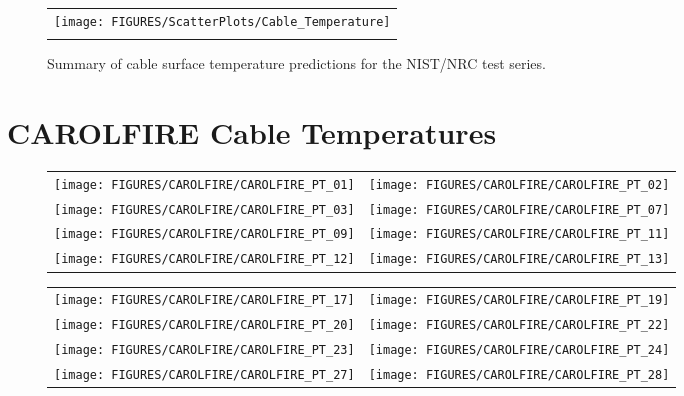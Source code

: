 \begin{figure}[p]
\begin{center}
\begin{tabular}{c}
\texttt{[image: FIGURES/ScatterPlots/Cable\_Temperature]} \\
\vspace{0.25in}
\end{tabular}
\end{center}
\caption[Summary of cable surface temperature predictions, NIST/NRC test series.]
{Summary of cable surface temperature predictions for the NIST/NRC test series.}
\end{figure}



\clearpage

\section{CAROLFIRE Cable Temperatures}

\begin{figure}[p]
\begin{tabular*}{\textwidth}{l@{\extracolsep{\fill}}r}
\texttt{[image: FIGURES/CAROLFIRE/CAROLFIRE\_PT\_01]} &
\texttt{[image: FIGURES/CAROLFIRE/CAROLFIRE\_PT\_02]} \\
\texttt{[image: FIGURES/CAROLFIRE/CAROLFIRE\_PT\_03]} &
\texttt{[image: FIGURES/CAROLFIRE/CAROLFIRE\_PT\_07]} \\
\texttt{[image: FIGURES/CAROLFIRE/CAROLFIRE\_PT\_09]} &
\texttt{[image: FIGURES/CAROLFIRE/CAROLFIRE\_PT\_11]} \\
\texttt{[image: FIGURES/CAROLFIRE/CAROLFIRE\_PT\_12]} &
\texttt{[image: FIGURES/CAROLFIRE/CAROLFIRE\_PT\_13]} 
\end{tabular*}
\label{CAROLFIRE_Thermoset_1}
\end{figure}

\begin{figure}[p]
\begin{tabular*}{\textwidth}{l@{\extracolsep{\fill}}r}
\texttt{[image: FIGURES/CAROLFIRE/CAROLFIRE\_PT\_17]} &
\texttt{[image: FIGURES/CAROLFIRE/CAROLFIRE\_PT\_19]} \\
\texttt{[image: FIGURES/CAROLFIRE/CAROLFIRE\_PT\_20]} &
\texttt{[image: FIGURES/CAROLFIRE/CAROLFIRE\_PT\_22]} \\
\texttt{[image: FIGURES/CAROLFIRE/CAROLFIRE\_PT\_23]} &
\texttt{[image: FIGURES/CAROLFIRE/CAROLFIRE\_PT\_24]} \\
\texttt{[image: FIGURES/CAROLFIRE/CAROLFIRE\_PT\_27]} &
\texttt{[image: FIGURES/CAROLFIRE/CAROLFIRE\_PT\_28]} 
\end{tabular*}
\label{CAROLFIRE_Thermoset_2}
\end{figure}

